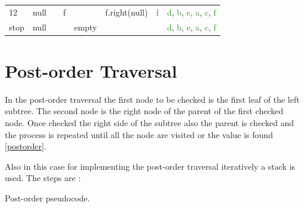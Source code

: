 \begin{center}
\begin{tabular}{ l|c|c|c|c|c|c|c }
 12 & null & & f & & f.right(\textcolor{BrickRed}{null}) & \textcolor{ForestGreen}{f} & \textcolor{ForestGreen}{d}, \textcolor{ForestGreen}{b}, \textcolor{ForestGreen}{e}, \textcolor{ForestGreen}{a}, \textcolor{ForestGreen}{c}, \textcolor{ForestGreen}{f} \\

\textcolor{BrickRed}{stop} & \textcolor{BrickRed}{null} &  & & \textcolor{BrickRed}{empty} & & & \textcolor{ForestGreen}{d}, \textcolor{ForestGreen}{b}, \textcolor{ForestGreen}{e}, \textcolor{ForestGreen}{a}, \textcolor{ForestGreen}{c}, \textcolor{ForestGreen}{f} \\
\end{tabular}
\end{center}

\section{Post-order Traversal}
\label{postorderappendix}
In the post-order traversal the first node to be checked is the first leaf of the left subtree. The second node is the right node of the parent of the first checked node. Once checked the right side of the subtree also the parent is checked and the process is repeated until all the node are visited or the value is found \ref{postorder}. 

Also in this case for implementing the post-order traversal iteratively a stack is used. The steps are \cite{wikitreestrav}:

\begin{algorithm}[H]
	\DontPrintSemicolon
	\LinesNumbered
  	\;
\caption{Post-order pseudocode.}
\end{algorithm}


